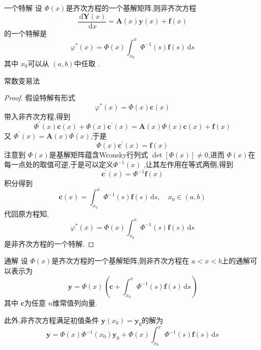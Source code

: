 \documentclass[lang=cn,12pt,color=green,fontset=none]{elegantbook}
\begin{document}
\begin{lemma}{一个特解}\label{a-sp-sol}
    设 $ \Phi \left( x \right)  $是齐次方程的一个基解矩阵,则非齐次方程 $$
    \frac{\,\mathrm{d} \mathbf{Y}\left( x \right)  }{\,\mathrm{d} x }  = \mathbf{A}\left( x \right)\mathbf{y}\left( x \right)+ \mathbf{f}\left( x \right)   
    $$  的一个特解是 $$
    \varphi ^{*}\left( x \right) =\Phi \left( x \right)\int_{x_0}^{x}\Phi ^{-1} \left( s \right) \mathbf{f}\left( s \right)\,\mathrm{d} s    
    $$其中 $ x_0 $可以从 $ \left( a,b \right)  $中任取   .
\end{lemma}
\begin{note}
    常数变易法
\end{note}
\begin{proof}
    假设特解有形式 $$
    \varphi ^{*}\left( x \right)= \Phi \left( x \right) \mathbf{c}\left( x \right)   
    $$带入非齐次方程,得到 $$
    \Phi ^{\prime} \left( x \right)\mathbf{c}\left( x \right)+ \Phi \left( x \right) \mathbf{c}^{\prime} \left( x \right)   = \mathbf{A}\left( x \right)\Phi \left( x \right)\mathbf{c}\left( x \right)+ \mathbf{f}\left( x \right)     
    $$又 $ \Phi ^{\prime} \left( x \right)= \mathbf{A}\left( x \right)\Phi \left( x \right)    $,于是 $$
    \Phi \left( x \right) \mathbf{c}^{\prime} \left( x \right)=\mathbf{f}\left( x \right)   
    $$注意到 $ \Phi \left( x \right)  $是基解矩阵蕴含Wronsky行列式 $\det [\Phi \left( x \right) ]\neq 0 $,进而 $ \Phi \left( x \right)  $在每一点处的取值可逆,于是可以定义$ \Phi ^{-1} \left( x \right)  $ ,让其左作用在等式两侧,得到 $$
    \mathbf{c}^{\prime} \left( x \right)= \Phi ^{-1} \mathbf{f}\left( x \right)  
    $$   积分得到 $$
    \mathbf{c}\left( x \right)= \int_{x_0}^{x}\Phi ^{-1} \left( s \right)\mathbf{f}\left( s \right)\,\mathrm{d} s   ,\quad x_0\in \left( a,b \right) 
    $$代回原方程知, $$
    \varphi ^{*}\left( x \right) =\Phi \left( x \right)\int_{x_0}^{x}\Phi ^{-1} \left( s \right)\mathbf{f}\left( s \right)\,\mathrm{d} s 
    $$是非齐次方程的一个特解.
\end{proof}
\begin{theorem}{通解}
    设 $ \Phi \left( x \right)  $是齐次方程的一个基解矩阵,则非齐次方程在 $ a<x<b $上的通解可以表示为 $$
    \mathbf{y}=\Phi \left( x \right)\left( \mathbf{c}+  \int_{x_0}^{x} \Phi ^{-1} \left( s \right)\mathbf{f}\left( s \right)\,\mathrm{d} s   \right)  
    $$其中 $ \mathbf{c} $为任意 $ n $维常值列向量.
    
    此外,非齐次方程满足初值条件 $ \mathbf{y}\left( x_0 \right)=\mathbf{y}_{0}  $的解为 $$
    \mathbf{y}= \Phi \left( x \right) \Phi ^{-1} \left( x_0 \right)\mathbf{y}_{0} + \Phi \left( x \right)\int_{x_0}^{x} \Phi ^{-1} \left( s \right)\mathbf{f}\left( s \right)\,\mathrm{d} s     
    $$ 
\end{theorem}
\end{document}
